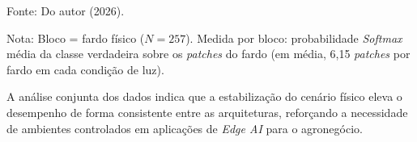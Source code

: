 \begin{table}[!h]
    \centering
    \begin{threeparttable}
    \caption{Teste de Friedman por fardo pareado: postos médios por condição de iluminação.}
    \label{tab:friedman_detailed}
    
    \begin{tablenotes}
        \small
        \item[] Fonte: Do autor (2026).
        \item[] Nota: Bloco = fardo físico ($N = 257$). Medida por bloco: probabilidade \textit{Softmax} média da classe verdadeira sobre os \textit{patches} do fardo (em média, 6,15 \textit{patches} por fardo em cada condição de luz).
    \end{tablenotes}
    \end{threeparttable}
\end{table}

A análise conjunta dos dados indica que a estabilização do cenário físico eleva o desempenho de forma consistente entre as arquiteturas, reforçando a necessidade de ambientes controlados em aplicações de \textit{Edge AI} para o agronegócio.